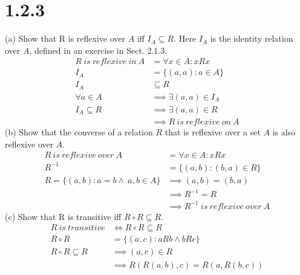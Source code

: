 \documentclass{article}
\begin{document}
\section*{1.2.3}
(a) Show that R is reflexive over $A$ iff $I_A \subseteq R$. Here $I_A$ is the identity relation over $A$, defined in an exercise in Sect. 2.1.3.
\begin{align*}
    R\ is\ reflexive\ in\ A &= \forall x \in A: xRx\\
    I_A &= \{(a,a): a \in A\}\\
    I_A &\subseteq R\\
    \forall a \in A &\implies \exists (a, a) \in I_A\\
    I_A \subseteq R &\implies \exists(a,a) \in R\\
    &\implies R\ is\ reflexive\ on\ A
\end{align*}
(b) Show that the converse of a relation $R$ that is reflexive over a set $A$ is also reflexive over $A$.
\begin{align*}
    R\ is\ reflexive\ over\ A &= \forall x \in A: xRx\\
    R^{-1} &= \{(a, b): (b, a) \in R\}\\
    R = \{(a, b): a = b \wedge\ a, b \in A\} &\implies (a, b) = (b, a)\\
    &\implies R^{-1} = R\\
    &\implies R^{-1}\ is\ reflexive\ over\ A
\end{align*}
(c) Show that R is transitive iff $R \circ R \subseteq R$.
\begin{align*}
    R\ is\ transitive &\iff R \circ R \subseteq R\\
    R \circ R &= \{(a, c): aRb \wedge bRc\}\\
    R \circ R \subseteq R &\implies (a, c) \in R\\
    &\implies R(R(a,b), c) = R(a, R(b, c))
\end{align*}
\newpage
\end{document}
